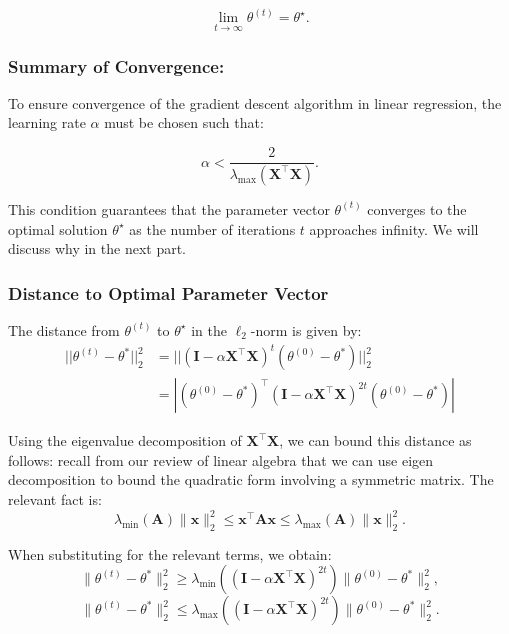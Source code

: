 \[
    \lim_{t \to \infty} \theta^{(t)} = \theta^\star.
\]

\subsubsection{Summary of Convergence:}

To ensure convergence of the gradient descent algorithm in linear regression, the learning rate \(\alpha\) must be chosen such that:

\[
    \alpha < \frac{2}{\lambda_{\max}(\boldsymbol{X}^\top \boldsymbol{X})}.
\]

This condition guarantees that the parameter vector \(\theta^{(t)}\) converges to the optimal solution \(\theta^\star\) as the number of iterations \(t\) approaches infinity. We will discuss why in the next part.

\subsubsection{Distance to Optimal Parameter Vector}

The distance from \(\theta^{(t)}\) to \(\theta^\star\) in the \(\ell_2\)-norm is given by:
\[\begin{aligned}
    ||\theta^{(t)}-\theta^{*}||_{2}^{2} & =||(\mathbf{I}-\alpha\mathbf{X}^{\top}\mathbf{X})^{t}(\theta^{(0)}-\theta^{*})||_{2}^{2}                                \\
                        & =|(\theta^{(0)}-\theta^{*})^{\top}(\mathbf{I}-\alpha\boldsymbol{X}^{\top}\boldsymbol{X})^{2t}(\theta^{(0)}-\theta^{*})|
    \end{aligned}\]


Using the eigenvalue decomposition of \(\boldsymbol{X}^\top \boldsymbol{X}\), we can bound this distance as follows: recall from our review of linear algebra that we can use eigen decomposition to bound the quadratic form involving a symmetric matrix. The relevant fact is:
\[
    \lambda_{\min}(\boldsymbol{A})\|\boldsymbol{x}\|_2^2 \leq \boldsymbol{x}^\top\boldsymbol{A}\boldsymbol{x} \leq \lambda_{\max}(\boldsymbol{A})\|\boldsymbol{x}\|_2^2.
\]

When substituting for the relevant terms, we obtain:
\[
    \|\theta^{(t)} - \theta^{*}\|_{2}^{2} \geq \lambda_{\min}((\mathbf{I} - \alpha \mathbf{X}^{\top} \mathbf{X})^{2t}) \|\theta^{(0)} - \theta^{*}\|_{2}^{2},
\]
\[
    \|\theta^{(t)} - \theta^{*}\|_{2}^{2} \leq \lambda_{\max}((\mathbf{I} - \alpha \mathbf{X}^{\top} \mathbf{X})^{2t}) \|\theta^{(0)} - \theta^{*}\|_{2}^{2}.
\]

